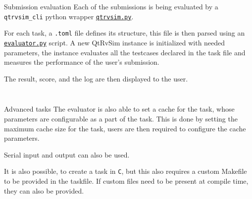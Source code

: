 \documentclass{beamer}
\begin{document}
		\begin{frame}{Submission evaluation}
			Each of the submissions is being evaluated by a \texttt{qtrvsim\_cli} python 
			wrapper \href{https://gitlab.fel.cvut.cz/b35apo/qtrvsim-eval-web/-/blob/main/evaluator/qtrvsim.py}{\texttt{qtrvsim.py}}. \par
	
			For each task, a \texttt{.toml} file defines its structure, this file is then parsed using an \href{https://gitlab.fel.cvut.cz/b35apo/qtrvsim-eval-web/-/blob/main/evaluator/evaluator.py}{\texttt{evaluator.py}} script. A new QtRvSim instance is initialized with needed parameters,
			the instance evaluates all the testcases declared in the task file and measures the performance of the user's submission. \par
	
			The result, score, and the log are then displayed to the user.
		\end{frame}
	
		\begin{frame}[fragile]
			\tiny
			\inputminted{python}{examples/5/evaluate.py}
		\end{frame}

		\begin{frame}[fragile]
			\tiny
			\inputminted{toml}{examples/5/task.toml}
		\end{frame}

		\begin{frame}{Advanced tasks}
			The evaluator is also able to set a cache for the task, whose parameters are configurable as a part of the task. This is done by setting the maximum cache size for the task, users are then required to configure the cache parameters. \par

			Serial input and output can also be used. \par

			It is also possible, to create a task in \texttt{C}, but this also requires a custom Makefile to be provided in the taskfile. If custom files need to be present at compile time, they can also be provided. \par
		\end{frame}

		\begin{frame}[fragile]
			\small
			\inputminted{toml}{examples/5/cache.toml}
		\end{frame}

		\begin{frame}[fragile]
			\tiny
			\inputminted{toml}{examples/5/complex.toml}
		\end{frame}
\end{document}
